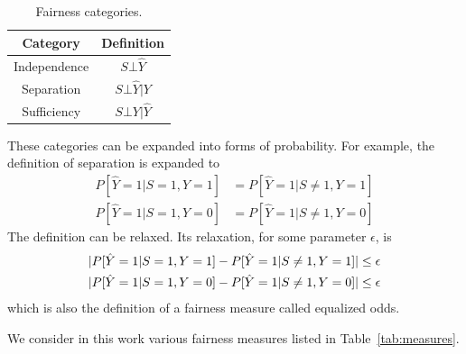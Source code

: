 \documentclass[manuscript,screen,review,anonymous]{acmart}
\DeclarePairedDelimiter{\abs}{\lvert}{\rvert}
\begin{document}
\begin{table}[h]
\caption{Fairness categories.}
\label{tab:categories}
\begin{tabular}{cc}
\toprule
\textbf{Category} & \textbf{Definition} \\
\midrule
Independence & $S \bot \hat{Y}$ \\
Separation & $S \bot \hat{Y} | Y$ \\
Sufficiency & $S \bot Y | \hat{Y}$ \\
\bottomrule
\end{tabular}
\end{table}

These categories can be expanded into forms of probability. For example, the definition of separation is expanded to
\begin{align*}
P[\hat{Y} = 1 | S = 1, Y = 1] & = P[\hat{Y} = 1 | S \neq 1, Y = 1] \\
P[\hat{Y} = 1 | S = 1, Y = 0] & = P[\hat{Y} = 1 | S \neq 1, Y = 0]
\end{align*}
The definition can be relaxed. Its relaxation, for some parameter $\epsilon$, is
\begin{align*}
\abs{P[\hat{Y} = 1 | S = 1, Y = 1] - P[\hat{Y} = 1 | S \neq 1, Y = 1]} & \leq \epsilon \\
\abs{P[\hat{Y} = 1 | S = 1, Y = 0] - P[\hat{Y} = 1 | S \neq 1, Y = 0]} & \leq \epsilon
\end{align*}
which is also the definition of a fairness measure called equalized odds.

We consider in this work various fairness measures listed in Table~\ref{tab:measures}.
\end{document}
